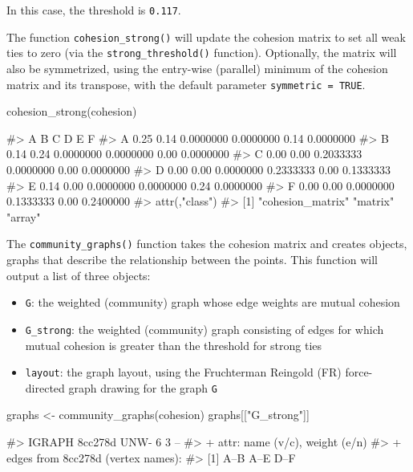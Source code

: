 In this case, the threshold is \texttt{0.117}.

The function \texttt{cohesion\_strong()} will update the cohesion matrix
to set all weak ties to zero (via the \texttt{strong\_threshold()}
function). Optionally, the matrix will also be symmetrized, using the
entry-wise (parallel) minimum of the cohesion matrix and its transpose,
with the default parameter \texttt{symmetric\ =\ TRUE}.

\begin{Schunk}
\begin{Sinput}
cohesion_strong(cohesion)
\end{Sinput}
\begin{Soutput}
#>      A    B         C         D    E         F
#> A 0.25 0.14 0.0000000 0.0000000 0.14 0.0000000
#> B 0.14 0.24 0.0000000 0.0000000 0.00 0.0000000
#> C 0.00 0.00 0.2033333 0.0000000 0.00 0.0000000
#> D 0.00 0.00 0.0000000 0.2333333 0.00 0.1333333
#> E 0.14 0.00 0.0000000 0.0000000 0.24 0.0000000
#> F 0.00 0.00 0.0000000 0.1333333 0.00 0.2400000
#> attr(,"class")
#> [1] "cohesion_matrix" "matrix"          "array"
\end{Soutput}
\end{Schunk}

The \texttt{community\_graphs()} function takes the cohesion matrix and
creates  objects, graphs that describe the relationship
between the points. This function will output a list of three objects:

\begin{itemize}
\tightlist
\item
  \texttt{G}: the weighted (community) graph whose edge weights are
  mutual cohesion
\item
  \texttt{G\_strong}: the weighted (community) graph consisting of edges
  for which mutual cohesion is greater than the threshold for strong
  ties
\item
  \texttt{layout}: the graph layout, using the Fruchterman Reingold (FR)
  force-directed graph drawing for the graph \texttt{G}
\end{itemize}

\begin{Schunk}
\begin{Sinput}
graphs <- community_graphs(cohesion)
graphs[["G_strong"]]
\end{Sinput}
\begin{Soutput}
#> IGRAPH 8cc278d UNW- 6 3 -- 
#> + attr: name (v/c), weight (e/n)
#> + edges from 8cc278d (vertex names):
#> [1] A--B A--E D--F
\end{Soutput}
\end{Schunk}

